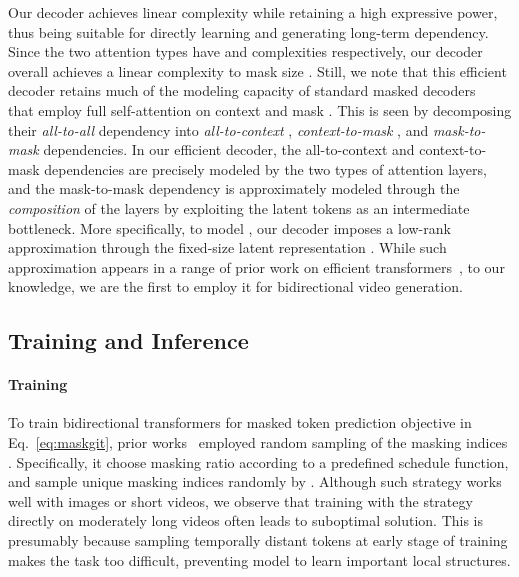 \documentclass[10pt,twocolumn,letterpaper]{article}
\begin{document}
Our decoder achieves linear complexity while retaining a high expressive power, thus being suitable for directly learning and generating long-term dependency.
Since the two attention types have  and  complexities respectively, our decoder overall achieves a linear complexity to mask size .
Still, we note that this efficient decoder retains much of the modeling capacity of standard masked decoders~\cite{BERT, MAE, MaskGIT} that employ full self-attention on context and mask .
This is seen by decomposing their \emph{all-to-all} dependency  into \emph{all-to-context} , \emph{context-to-mask} , and \emph{mask-to-mask}  dependencies.
In our efficient decoder, the all-to-context and context-to-mask dependencies are precisely modeled by the two types of attention layers, and the mask-to-mask dependency is approximately modeled through the \emph{composition} of the layers by exploiting the latent tokens  as an intermediate bottleneck.
More specifically, to model , our decoder imposes a low-rank approximation through the fixed-size latent representation .
While such approximation appears in a range of prior work on efficient transformers~\cite{SetTransformer, Linformer, LUNA, SetVAE}, to our knowledge, we are the first to employ it for bidirectional video generation.


























\subsection{Training and Inference}
\label{sec:train_inference}
\paragraph{Training} 
To train bidirectional transformers for masked token prediction objective in Eq.~\eqref{eq:maskgit}, prior works~\cite{MaskGIT,MaskViT} employed random sampling of the masking indices . 
Specifically, it choose masking ratio  according to a predefined schedule function, and sample  unique masking indices randomly by .
Although such strategy works well with images or short videos, we observe that training with the strategy directly on moderately long videos often leads to suboptimal solution.  
This is presumably because sampling temporally distant tokens at early stage of training makes the task too difficult, preventing model to learn important local structures. 
\end{document}
